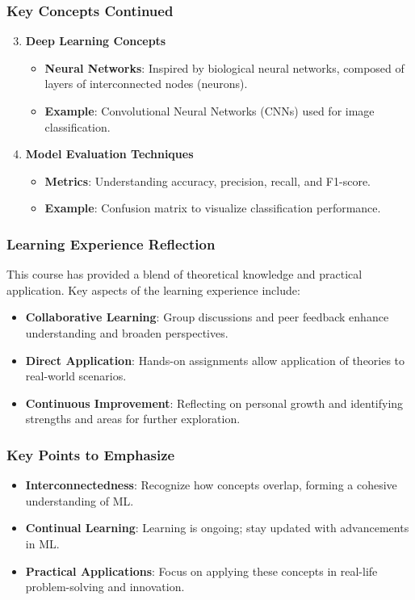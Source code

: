 \documentclass[aspectratio=169]{beamer}
\begin{document}
\begin{frame}[fragile]
    \frametitle{Key Concepts Continued}
    \begin{enumerate}
        \setcounter{enumi}{2} %
        \item \textbf{Deep Learning Concepts}
        \begin{itemize}
            \item \textbf{Neural Networks}: Inspired by biological neural networks, composed of layers of interconnected nodes (neurons).
            \item \textbf{Example}: Convolutional Neural Networks (CNNs) used for image classification.
        \end{itemize}

        \item \textbf{Model Evaluation Techniques}
        \begin{itemize}
            \item \textbf{Metrics}: Understanding accuracy, precision, recall, and F1-score.
            \item \textbf{Example}: Confusion matrix to visualize classification performance.
        \end{itemize}
    \end{enumerate}
\end{frame}

\begin{frame}[fragile]
    \frametitle{Learning Experience Reflection}
    This course has provided a blend of theoretical knowledge and practical application. Key aspects of the learning experience include:
    \begin{itemize}
        \item \textbf{Collaborative Learning}: Group discussions and peer feedback enhance understanding and broaden perspectives.
        \item \textbf{Direct Application}: Hands-on assignments allow application of theories to real-world scenarios.
        \item \textbf{Continuous Improvement}: Reflecting on personal growth and identifying strengths and areas for further exploration.
    \end{itemize}
\end{frame}

\begin{frame}[fragile]
    \frametitle{Key Points to Emphasize}
    \begin{itemize}
        \item \textbf{Interconnectedness}: Recognize how concepts overlap, forming a cohesive understanding of ML.
        \item \textbf{Continual Learning}: Learning is ongoing; stay updated with advancements in ML.
        \item \textbf{Practical Applications}: Focus on applying these concepts in real-life problem-solving and innovation.
    \end{itemize}
\end{frame}
\end{document}
